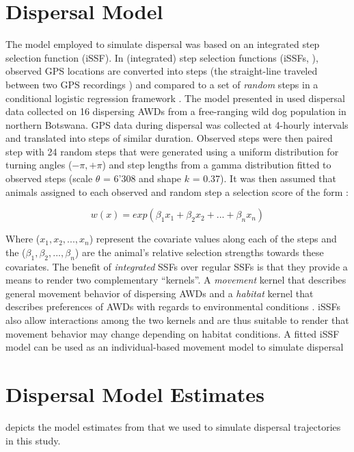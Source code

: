 \documentclass[abstract=on,10pt,a4paper,bibliography=totocnumbered]{article}
\begin{document}
\section{Dispersal Model}
The model employed to simulate dispersal was based on an integrated step
selection function (iSSF). In (integrated) step selection functions (iSSFs,
\citealp{Fortin.2005, Avgar.2016}), observed GPS locations are converted into
steps (the straight-line traveled between two GPS recordings
\citep{Turchin.1998}) and compared to a set of \textit{random} steps in a
conditional logistic regression framework \citep{Fortin.2005, Thurfjell.2014,
Muff.2020, Fieberg.2021}. The model presented in \citep{Hofmann.2023} used
dispersal data collected on 16 dispersing AWDs from a free-ranging wild dog
population in northern Botswana. GPS data during dispersal was collected at
4-hourly intervals and translated into steps of similar duration. Observed steps
were then paired step with 24 random steps that were generated using a uniform
distribution for turning angles (\(-\pi, +\pi\)) and step lengths from a gamma
distribution fitted to observed steps (scale \(\theta\) = 6'308 and shape \(k\)
= 0.37). It was then assumed that animals assigned to each observed and random
step a selection score of the form \citep{Fortin.2005}:

\begin{equation}
\label{EQ1}
  w(x) = exp(\beta_1 x_1 + \beta_2 x_2 + ... + \beta_n x_n)
\end{equation}

Where (\(x_1, x_2, ..., x_n\)) represent the covariate values along each of the
steps and the (\(\beta_1, \beta_2, ..., \beta_n\)) are the animal's relative
selection strengths \citealp{Avgar.2017} towards these covariates. The benefit
of \textit{integrated} SSFs over regular SSFs is that they provide a means to
render two complementary ``kernels''. A \textit{movement} kernel that describes
general movement behavior of dispersing AWDs and a \textit{habitat} kernel that
describes preferences of AWDs with regards to environmental conditions
\citep{Fieberg.2021}. iSSFs also allow interactions among the two kernels and
are thus suitable to render that movement behavior may change depending on
habitat conditions. A fitted iSSF model can be used as an individual-based
movement model to simulate dispersal \citep{Signer.2017, Hofmann.2023}

\newpage
\section{Dispersal Model Estimates}
 depicts the model estimates from \cite{Hofmann.2023} that we used
to simulate dispersal trajectories in this study.
\end{document}
